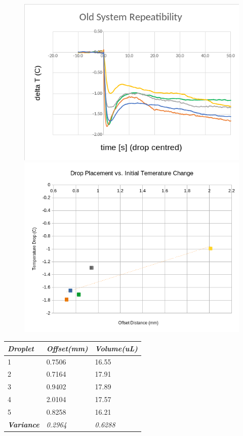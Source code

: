 \begin{figure}[h]
    \begin{center}
        \includegraphics[width=.4\textwidth]{img/drop_temps_2018.png}
        \includegraphics[width=.4\textwidth]{img/2018_pos_temp_trend.png}
    \end{center}
\end{figure}

\begin{table}[h]
    \centering
    \begin{tabular}{|l|l|l|}
        \hline
        \textit{\textbf{Droplet}}                          & \textit{Offset(mm)} & \textit{Volume(uL)} \\ \hline
        \cellcolor[HTML]{9698ED}1                          & 0.7506              & 16.55               \\ \hline
        \cellcolor[HTML]{E9AD3F}2                          & 0.7164              & 17.91               \\ \hline
        \cellcolor[HTML]{C0C0C0}3                          & 0.9402              & 17.89               \\ \hline
        \cellcolor[HTML]{FFFC9E}4                          & 2.0104              & 17.57               \\ \hline
        \cellcolor[HTML]{79CD5D}5                          & 0.8258              & 16.21               \\ \hline
        \cellcolor[HTML]{FFFFFF}\textbf{\textit{Variance}} & \textit{0.2964}     & \textit{0.6288}     \\ \hline
    \end{tabular}
\end{table}

